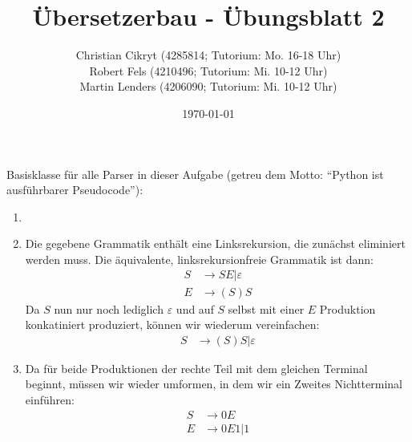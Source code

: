 \documentclass[a4paper,10pt]{scrartcl}
\title{Übersetzerbau - Übungsblatt 2}
\author{Christian Cikryt (4285814; Tutorium: Mo. 16-18 Uhr)\\
  Robert Fels (4210496; Tutorium: Mi. 10-12 Uhr)\\
  Martin Lenders (4206090; Tutorium: Mi. 10-12 Uhr)
  }
\date{\today}
\begin{document}
\maketitle

\section{}
Basisklasse für alle Parser in dieser Aufgabe (getreu dem Motto: "`Python ist ausführbarer Pseudocode"'):

\begin{enumerate}
 \item  \hspace{0cm}
 \item  Die gegebene Grammatik enthält eine Linksrekursion, die zunächst eliminiert werden muss.
        Die äquivalente, linksrekursionfreie Grammatik ist dann:
        \begin{align*}
            S &\to SE | \varepsilon \\
            E &\to (S)S
        \end{align*}
        Da $S$ nun nur noch lediglich $\varepsilon$ und auf $S$ selbst mit einer $E$ Produktion konkatiniert produziert,
        können wir wiederum vereinfachen:
        \begin{align*}
            S &\to (S)S | \varepsilon
        \end{align*}
        
 \item	Da für beide Produktionen der rechte Teil mit dem gleichen Terminal beginnt, müssen wir wieder umformen, in dem wir ein 
        Zweites Nichtterminal einführen:
        \begin{align*}
            S &\to 0E \\
            E &\to 0E1 | 1
        \end{align*}
        
\end{enumerate}

\section{}
\end{document}
